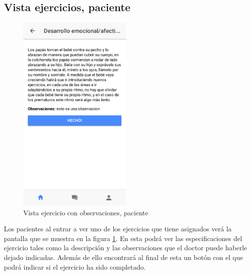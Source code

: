 \subsection{Vista ejercicios, paciente}
\begin{figure}[!h]
    \centering
    \includegraphics[width=0.5\textwidth]{images/screenshots/Paciente-vista-ejercicio-con-observaciones.png}
    \caption{Vista ejercicio con observaciones, paciente}
    \label{ejercicio-con-observaciones}
\end{figure}

Los pacientes al entrar a ver uno de los ejercicios que tiene asignados verá
la pantalla que se muestra en la figura \ref{ejercicio-con-observaciones}. En
esta podrá ver las especificaciones del ejercicio tales como la descripción y
las observaciones que el doctor puede haberle dejado indicadas. Además de
ello encontrará al final de esta un botón con el que podrá indicar si el
ejercicio ha sido completado.
\clearpage

